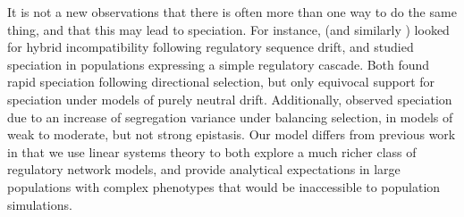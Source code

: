 \documentclass{article}
\newcommand{\jss}[1]{{\color{olive}\it #1}}
\newcommand{\1}{\mathbbm{1}}
\begin{document}
%

It is not a new observations that there is often more than one way to do the same thing,
and that this may lead to speciation.
For instance, \citet{tulchinsky2014hybrid} (and similarly \citet{khatri2015simple}) looked for hybrid incompatibility
following regulatory sequence drift,
and \citet{porter2002speciation} studied speciation in populations expressing a simple regulatory cascade.
Both found rapid speciation following directional selection,
but only equivocal support for speciation under models of purely neutral drift.
Additionally, \citet{fierst} observed speciation due to an increase of segregation variance under balancing selection, in models of weak to moderate, but not strong epistasis.
Our model differs from previous work in that we use linear systems theory
to both explore a much richer class of regulatory network models,
and provide analytical expectations in large populations with complex phenotypes
that would be inaccessible to population simulations.
\end{document}
